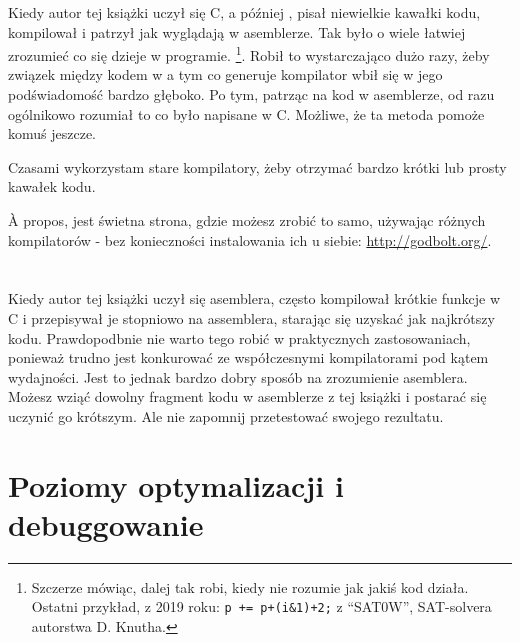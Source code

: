 
Kiedy autor tej książki uczył się C, a później \Cpp, pisał niewielkie kawałki kodu, kompilował
i patrzył jak wyglądają w asemblerze. Tak było o wiele łatwiej zrozumieć co się dzieje w programie.%
\footnote{Szczerze mówiąc, dalej tak robi, kiedy nie rozumie jak jakiś kod działa.
Ostatni przykład, z 2019 roku: \verb|p += p+(i&1)+2;| z ``SAT0W'', SAT-solvera autorstwa D. Knutha.}.
Robił to wystarczająco dużo razy, żeby związek między kodem w \CCpp a tym co generuje kompilator wbił się w jego podświadomość bardzo głęboko.
Po tym, patrząc na kod w asemblerze, od razu ogólnikowo rozumiał to co było napisane w C.
Możliwe, że ta metoda pomoże komuś jeszcze.


Czasami wykorzystam stare kompilatory, żeby otrzymać bardzo krótki lub prosty kawałek kodu.

À propos, jest świetna strona, gdzie możesz zrobić to samo, używając różnych kompilatorów - bez konieczności instalowania ich u siebie: \url{http://godbolt.org/}.

\section*{\Exercises}

Kiedy autor tej książki uczył się asemblera, często kompilował krótkie funkcje w C i przepisywał
je stopniowo na assemblera, starając się uzyskać jak najkrótszy kodu.
Prawdopodbnie nie warto tego robić w praktycznych zastosowaniach,
ponieważ trudno jest konkurować ze współczesnymi kompilatorami pod kątem wydajności. Jest to jednak bardzo dobry sposób na zrozumienie asemblera.
Możesz wziąć dowolny fragment kodu w asemblerze z tej książki i postarać się uczynić go krótszym.
Ale nie zapomnij przetestować swojego rezultatu.

\section*{Poziomy optymalizacji i debuggowanie}

